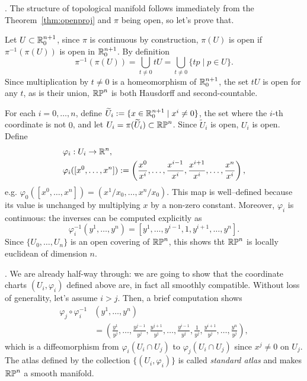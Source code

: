 \begin{example}
  .
  The structure of topological manifold follows immediately from the Theorem~\ref{thm:openproj} and $\pi$ being open, so let's prove that.

  Let $U\subset\mathbb{R}_0^{n+1}$, since $\pi$ is continuous by construction, $\pi(U)$ is open if $\pi^{-1}(\pi(U))$ is open in $\mathbb{R}^{n+1}_0$.
  By definition
  \begin{equation}
    \pi^{-1}(\pi(U)) = \bigcup_{t\neq 0} tU = \bigcup_{t\neq 0}\{tp \mid p\in U\}.
  \end{equation}
  Since multiplication by $t\neq 0$ is a homeomorphism of $\mathbb{R}_0^{n+1}$, the set $t U$ is open for any $t$, as is their union, $\mathbb{RP}^n$ is both Hausdorff and second-countable.

  For each $i=0,\ldots,n$, define $\widetilde U_i := \{x\in\mathbb{R}^{n+1}_0 \mid x^i\neq0\}$, the set where the $i$-th coordinate is not $0$, and let $U_i = \pi(\widetilde U_i)\subset \mathbb{RP}^n$.
  Since $\widetilde U_i$ is open, $U_i$ is open.
  Define
  \begin{align}
    &\varphi_i:U_i\to\mathbb{R}^n,\\
    &\varphi_i([x^0, \ldots, x^n]):= \left(\frac{x^0}{x^i},\ldots,\frac{x^{i-1}}{x^i},\frac{x^{i+1}}{x^i},\ldots,\frac{x^n}{x^i}\right),
  \end{align}
  e.g. $\varphi_0([x^0, \ldots, x^n]) = (x^1/x_0, \ldots, x^n/x_0)$.
  This map is well--defined because its value is unchanged by multiplying $x$ by a non-zero constant.
  Moreover, $\varphi_i$ is continuous: the inverses can be computed explicitly as
  \begin{equation}
    \varphi_i^{-1}(y^1,\ldots,y^n) = \left[y^1, \ldots, y^{i-1}, 1, y^{i+1}, \ldots, y^n\right].
  \end{equation}
  Since $\{U_0, \ldots, U_n\}$ is an open covering of $\mathbb{RP}^n$, this shows tht $\mathbb{RP}^n$ is locally euclidean of dimension $n$.

  .
  We are already half-way through: we are going to show that the coordinate charts $(U_i, \varphi_i)$ defined above are, in fact all smoothly compatible.
  Without loss of generality, let's assume $i>j$.
  Then, a brief computation shows
  \begin{align}
    \varphi_j\circ\varphi_i^{-1}& (y^1, \ldots, y^n) \\
    &= \left(\frac{y^1}{y^j},\ldots,\frac{y^{j-1}}{y^j},\frac{y^{j+1}}{y^j},\ldots,\frac{y^{i-1}}{y^j},\frac1{y^j},\frac{y^{i+1}}{y^j}, \ldots, \frac{y^n}{y^j}\right),
  \end{align}
  which is a diffeomorphism from $\varphi_i(U_i\cap U_j)$ to $\varphi_j(U_i\cap U_j)$ since $x^j\neq 0$ on $U_j$.
  The atlas defined by the collection $\{(U_i, \varphi_i)\}$ is called \emph{standard atlas} and makes $\mathbb{RP}^n$ a smooth manifold. 
\end{example}

